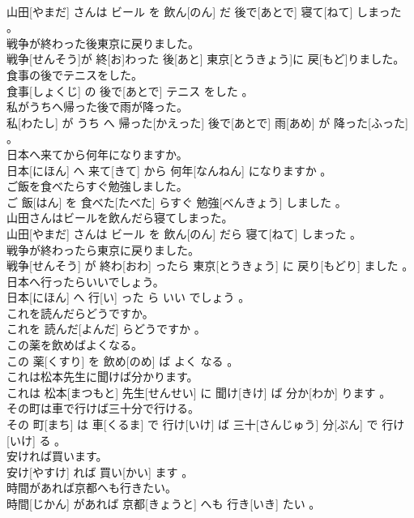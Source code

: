 \documentclass[8pt]{extreport}
\begin{document}
\begin{CJK}{UTF8}{min}
\\	山田[やまだ] さんは ビール を 飲ん[のん] だ 後で[あとで] 寝て[ねて] しまった 。
\\	戦争が終わった後東京に戻りました。	
\\	戦争[せんそう]が 終[お]わった 後[あと] 東京[とうきょう]に 戻[もど]りました。
\\	食事の後でテニスをした。	
\\	食事[しょくじ] の 後で[あとで] テニス をした 。
\\	私がうちへ帰った後で雨が降った。	
\\	私[わたし] が うち へ 帰った[かえった] 後で[あとで] 雨[あめ] が 降った[ふった] 。
\\	日本へ来てから何年になりますか。	
\\	日本[にほん] へ 来て[きて] から 何年[なんねん] になりますか 。
\\	ご飯を食べたらすぐ勉強しました。	
\\	ご 飯[はん] を 食べた[たべた] らすぐ 勉強[べんきょう] しました 。
\\	山田さんはビールを飲んだら寝てしまった。	
\\	山田[やまだ] さんは ビール を 飲ん[のん] だら 寝て[ねて] しまった 。
\\	戦争が終わったら東京に戻りました。	
\\	戦争[せんそう] が 終わ[おわ] ったら 東京[とうきょう] に 戻り[もどり] ました 。
\\	日本へ行ったらいいでしょう。	
\\	日本[にほん] へ 行[い] った ら いい でしょう 。
\\	これを読んだらどうですか。	
\\	これを 読んだ[よんだ] らどうですか 。
\\	この薬を飲めばよくなる。	
\\	この 薬[くすり] を 飲め[のめ] ば よく なる 。
\\	これは松本先生に聞けば分かります。	
\\	これは 松本[まつもと] 先生[せんせい] に 聞け[きけ] ば 分か[わか] ります 。
\\	その町は車で行けば三十分で行ける。	
\\	その 町[まち] は 車[くるま] で 行け[いけ] ば 三十[さんじゅう] 分[ぷん] で 行け[いけ] る 。
\\	安ければ買います。	
\\	安け[やすけ] れば 買い[かい] ます 。
\\	時間があれば京都へも行きたい。	
\\	時間[じかん] があれば 京都[きょうと] へも 行き[いき] たい 。

\end{CJK}
\end{document}
